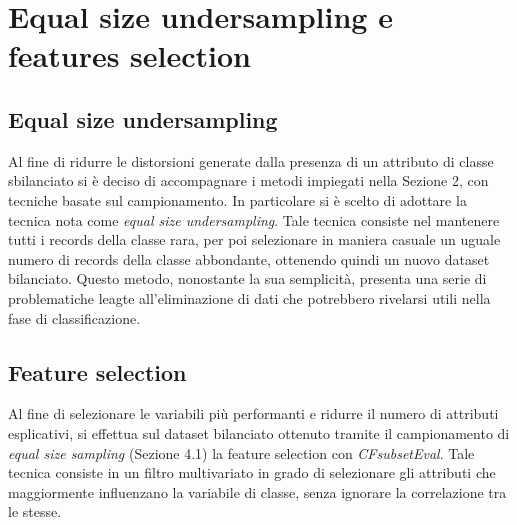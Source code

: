 \documentclass[fleqn,10pt]{SelfArx}
\begin{document}
\section{Equal size undersampling e features selection}
\subsection{Equal size undersampling}
Al fine di ridurre le distorsioni generate dalla presenza di un attributo di classe sbilanciato si è deciso di accompagnare i metodi impiegati nella Sezione 2, con tecniche basate sul campionamento. In particolare si è scelto di adottare la tecnica nota come \textit{equal size undersampling}. Tale tecnica consiste nel mantenere tutti i records della classe rara, per poi selezionare in maniera casuale un uguale numero di records della classe abbondante, ottenendo quindi un nuovo dataset bilanciato. Questo metodo, nonostante la sua semplicità, presenta una serie di problematiche leagte all'eliminazione di dati che potrebbero rivelarsi utili nella fase di classificazione.
\subsection{Feature selection}
Al fine di selezionare le variabili più performanti e ridurre il numero di attributi esplicativi, si effettua sul dataset bilanciato ottenuto tramite il campionamento di \textit{equal size sampling} (Sezione 4.1) la feature selection con \textit{CFsubsetEval}. Tale tecnica consiste in un filtro multivariato in grado di selezionare gli attributi che maggiormente influenzano la variabile di classe, senza ignorare la correlazione tra le stesse. 
\end{document}
